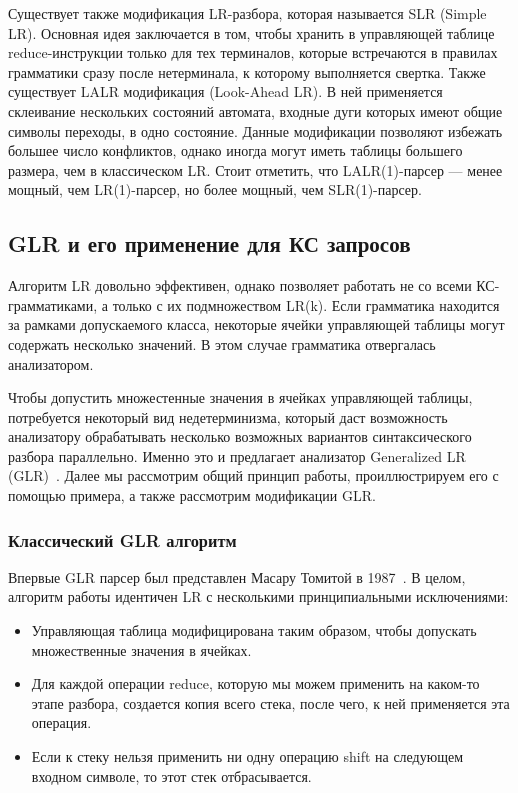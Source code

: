 Существует также модификация LR-разбора, которая называется SLR (Simple LR). 
Основная идея заключается в том, чтобы хранить в управляющей таблице reduce-инструкции только для тех терминалов, которые встречаются в правилах грамматики сразу после нетерминала, к которому выполняется свертка. 
Также существует LALR модификация (Look-Ahead LR).
В ней применяется склеивание нескольких состояний автомата, входные дуги которых имеют общие символы переходы, в одно состояние.
Данные модификации позволяют избежать большее число конфликтов, однако иногда могут иметь таблицы большего размера, чем в классическом LR.
Стоит отметить, что LALR(1)-парсер --- менее мощный, чем LR(1)-парсер, но более мощный, чем SLR(1)-парсер.

\subsection{GLR и его применение для КС запросов}

Алгоритм LR довольно эффективен, однако позволяет работать не со всеми КС-грамматиками, а только с их подмножеством LR(k). Если грамматика находится за рамками допускаемого класса, некоторые ячейки управляющей таблицы могут содержать несколько значений. В этом случае грамматика отвергалась анализатором.

Чтобы допустить множестенные значения в ячейках управляющей таблицы, потребуется некоторый вид недетерминизма, который даст возможность анализатору обрабатывать несколько возможных вариантов синтаксического разбора параллельно. Именно это и предлагает анализатор Generalized LR (GLR)~\cite{tomita-1987-efficient}. Далее мы рассмотрим общий принцип работы, проиллюстрируем его с помощью примера, а также рассмотрим модификации GLR.

\subsubsection{Классический GLR алгоритм}

Впервые GLR парсер был представлен Масару Томитой в 1987~\cite{tomita-1987-efficient}. В целом, алгоритм работы идентичен LR с несколькими принципиальными исключениями:
\begin{itemize}
	\item Управляющая таблица модифицирована таким образом, чтобы допускать множественные значения в ячейках.
	\item Для каждой операции reduce, которую мы можем применить на каком-то этапе разбора, создается копия всего стека, после чего, к ней применяется эта операция.
	\item Если к стеку нельзя применить ни одну операцию shift на следующем входном символе, то этот стек отбрасывается.
\end{itemize}


